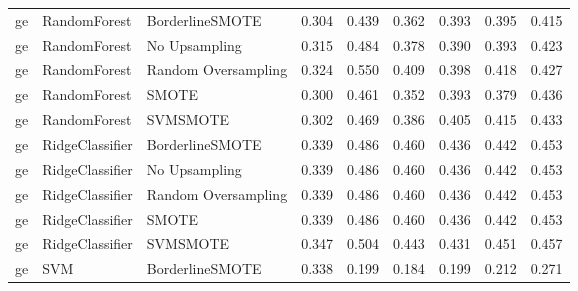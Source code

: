 \begin{tabular}{lllllllll}
      ge &                 RandomForest &     BorderlineSMOTE & 0.304 &                     0.439 &                 0.362 &                  0.393 &                                   0.395 &     0.415 \\
      ge &                 RandomForest &       No Upsampling & 0.315 &                     0.484 &                 0.378 &                  0.390 &                                   0.393 &     0.423 \\
      ge &                 RandomForest & Random Oversampling & 0.324 &                     0.550 &                 0.409 &                  0.398 &                                   0.418 &     0.427 \\
      ge &                 RandomForest &               SMOTE & 0.300 &                     0.461 &                 0.352 &                  0.393 &                                   0.379 &     0.436 \\
      ge &                 RandomForest &            SVMSMOTE & 0.302 &                     0.469 &                 0.386 &                  0.405 &                                   0.415 &     0.433 \\
      ge &              RidgeClassifier &     BorderlineSMOTE & 0.339 &                     0.486 &                 0.460 &                  0.436 &                                   0.442 &     0.453 \\
      ge &              RidgeClassifier &       No Upsampling & 0.339 &                     0.486 &                 0.460 &                  0.436 &                                   0.442 &     0.453 \\
      ge &              RidgeClassifier & Random Oversampling & 0.339 &                     0.486 &                 0.460 &                  0.436 &                                   0.442 &     0.453 \\
      ge &              RidgeClassifier &               SMOTE & 0.339 &                     0.486 &                 0.460 &                  0.436 &                                   0.442 &     0.453 \\
      ge &              RidgeClassifier &            SVMSMOTE & 0.347 &                     0.504 &                 0.443 &                  0.431 &                                   0.451 &     0.457 \\
      ge &                          SVM &     BorderlineSMOTE & 0.338 &                     0.199 &                 0.184 &                  0.199 &                                   0.212 &     0.271 \\

\end{tabular}
